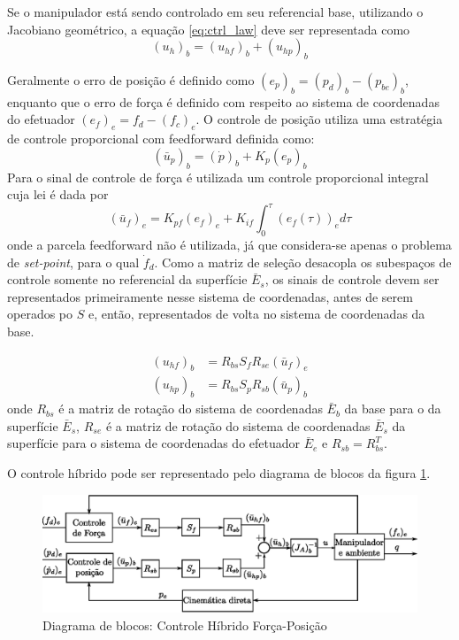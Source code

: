 Se o manipulador está sendo controlado em seu referencial base, utilizando o Jacobiano geométrico, a equação \eqref{eq:ctrl_law} deve ser representada como 
\begin{equation}
({u}_h)_b = ({u}_{hf})_b + ({u}_{hp})_b
\end{equation}

Geralmente o erro de posição é definido como $(e_p)_b = (p_d)_b - (p_{be})_b$, enquanto que o erro de força é definido com respeito ao sistema de coordenadas do efetuador  $(e_f)_e = f_d - (f_{c})_e$. O controle de posição utiliza uma estratégia de controle proporcional com feedforward definida como:
\begin{equation}
(\bar{u}_p)_b = (\dot{p})_b + K_{p} (e_p)_b
\end{equation}
Para o sinal de controle de força é utilizada um controle proporcional integral cuja lei é dada por 
\begin{equation}
(\bar{u}_f)_e = K_{pf} (e_f)_e + K_{if} \int^{\tau}_0 (e_f(\tau))_e d\tau
\end{equation}
onde a parcela feedforward não é utilizada, já que considera-se apenas o problema de \textit{set-point}, para o qual $\dot{f}_d$. Como a matriz de seleção desacopla os subespaços de controle somente no referencial da superfície $\bar{E}_s$, os sinais de controle devem ser representados primeiramente nesse sistema de coordenadas, antes de serem operados po $S$ e, então, representados de volta no sistema de coordenadas da base.

\begin{align}
({u}_{hf})_b &= R_{bs} S_f R_{se} (\bar{u}_f)_e \\
({u}_{hp})_b &= R_{bs} S_p R_{sb} (\bar{u}_p)_b 
\end{align}
onde $R_{bs}$ é a matriz de rotação do sistema de coordenadas $\bar{E}_b$ da base para o da superfície $\bar{E}_s$,   $R_{se}$ é a matriz de rotação do sistema de coordenadas $\bar{E}_s$ da superfície para o sistema de coordenadas do efetuador $\bar{E}_e$ e $R_{sb} = R_{bs}^T$. 

O controle híbrido pode ser representado pelo diagrama de blocos da figura \ref{fig:hybrid_block}.

\begin{figure}[H]
  \centering
  \includegraphics[width=\linewidth]{./img/hybrid.eps}
  \caption{Diagrama de blocos: Controle Híbrido Força-Posição}
  \label{fig:hybrid_block}
\end{figure}